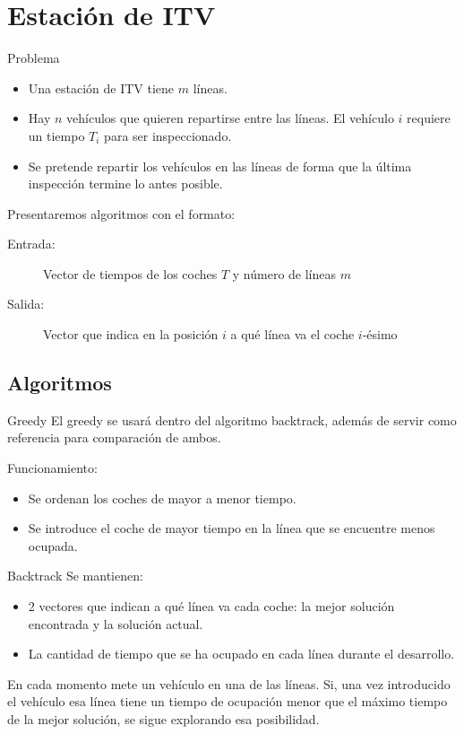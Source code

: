 \section{Estación de ITV}

\begin{frame}{Problema}
\begin{itemize}
	\item Una estación de ITV tiene $m$ líneas.
	\pause
	\item Hay $n$ vehículos que quieren repartirse entre las líneas. El vehículo $i$
	requiere un tiempo $T_i$ para ser inspeccionado.
	\pause
	\item Se pretende repartir los vehículos en las líneas de forma que la última
	inspección termine lo antes posible.
\end{itemize}
\pause

Presentaremos algoritmos con el formato:
\begin{description}
 \item[Entrada:] Vector de tiempos de los coches $T$ y número de líneas $m$
 \item[Salida:] Vector que indica en la posición $i$ a qué línea va el coche $i$-ésimo
\end{description}
\end{frame}

\subsection{Algoritmos}

\begin{frame}{Greedy}
	El greedy se usará dentro del algoritmo backtrack, además de servir como referencia para comparación de ambos.

	\pause

	Funcionamiento:
	\begin{itemize}
		\item Se ordenan los coches de mayor a menor tiempo.
		\item Se introduce el coche de mayor tiempo en la línea que se encuentre menos ocupada.
	\end{itemize}
\end{frame}

\begin{frame}{Backtrack}
	Se mantienen:

\begin{itemize}
  \item 2 vectores que indican a qué línea va cada coche: la mejor solución encontrada y la solución actual.
	\item La cantidad de tiempo que se ha ocupado en cada línea durante el desarrollo.
\end{itemize}
	\pause

	En cada momento mete un vehículo en una de las líneas. Si, una vez introducido el vehículo esa línea tiene un tiempo de ocupación menor que el máximo tiempo de la mejor solución, se sigue explorando esa posibilidad.
\end{frame}

